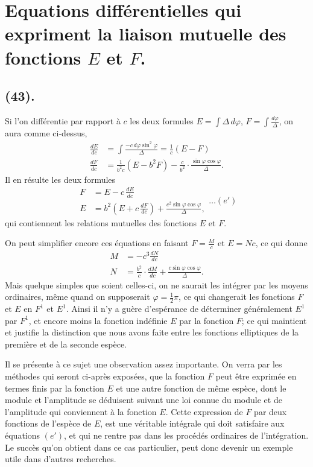 \documentclass{article}
\begin{document}
\section*{Equations différentielles qui expriment la liaison mutuelle des fonctions $E$ et $F$.}

\subsection*{(43).}

Si l'on différentie par rapport à $c$ les deux formules $E=\displaystyle\int\Delta\,d\varphi$, $F=\displaystyle\int\frac{d\varphi}{\Delta}$, on aura comme ci-dessus,
\[ \begin{aligned} \frac{dE}{dc}&=\int\frac{-c\,d\varphi\sin^{2}\varphi}{\Delta}=\frac{1}{c}(E-F)\\ \frac{dF}{dc}&=\frac{1}{b^{2}c}(E-b^{2}F)-\frac{c}{b^{2}}\cdot\frac{\sin\varphi\cos\varphi}{\Delta}. \end{aligned} \]
Il en résulte les deux formules
\[ \begin{aligned} F&=E-c\,\frac{dE}{dc}\\ E&=b^{2}\left(E+c\,\frac{dF}{dc}\right)+\frac{c^{2}\sin\varphi\cos\varphi}{\Delta}, \end{aligned}\ldots(e') \]
qui contiennent les relations mutuelles des fonctions $E$ et $F$.


On peut simplifier encore ces équations en faisant $F=\frac{M}{c}$ et $E=Nc$, ce qui donne
\[ \begin{aligned} M&=-c^{3}\frac{dN}{dc}\\ N&=\frac{b^{2}}{c}\cdot\frac{dM}{dc}+\frac{c\sin\varphi\cos\varphi}{\Delta}. \end{aligned} \]
Mais quelque simples que soient celles-ci, on ne saurait les intégrer par les moyens ordinaires, même quand on supposerait $\varphi=\frac{1}{2}\pi$, ce qui changerait les fonctions $F$ et $E$ en $F^{1}$ et $E^{1}$. Ainsi il n'y a guère d'espérance de déterminer généralement $E^{1}$ par $F^{1}$, et encore moins la fonction indéfinie $E$ par la fonction $F$; ce qui maintient et justifie la distinction que nous avons faite entre les fonctions elliptiques de la première et de la seconde espèce.

Il se présente à ce sujet une observation assez importante. On verra par les méthodes qui seront ci-après exposées, que la fonction $F$ peut être exprimée en termes finis par la fonction $E$ et une autre fonction de même espèce, dont le module et l'amplitude se déduisent suivant une loi connue du module et de l'amplitude qui conviennent à la fonction $E$. Cette expression de $F$ par deux fonctions de l'espèce de $E$, est une véritable intégrale qui doit satisfaire aux équations $(e')$, et qui ne rentre pas dans les procédés ordinaires de l'intégration. Le succès qu'on obtient dans ce cas particulier, peut donc devenir un exemple utile dans d'autres recherches.
\end{document}
